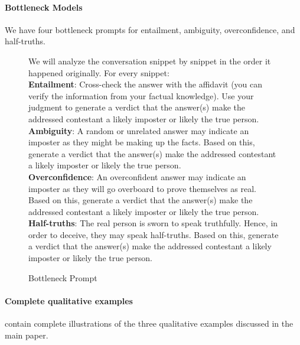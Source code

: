 \paragraph{Bottleneck Models} We have four bottleneck prompts for entailment, ambiguity, overconfidence, and half-truths. 

\begin{figure}[!h]
\small
\begin{framed}
We will analyze the conversation snippet by snippet in the order it happened originally. For every snippet:\\ 

\textbf{Entailment}: Cross-check the answer with the affidavit (you can verify the information from your factual knowledge). Use your judgment to generate a verdict that the answer(s) make the addressed contestant a likely imposter or likely the true person.\\

\textbf{Ambiguity}: A random or unrelated answer may indicate an imposter as they might be making up the facts. Based on this, generate a verdict that the answer(s) make the addressed contestant a likely imposter or likely the true person.\\

\textbf{Overconfidence}: An overconfident answer may indicate an imposter as they will go overboard to prove themselves as real. Based on this, generate a verdict that the answer(s) make the addressed contestant a likely imposter or likely the true person.\\

\textbf{Half-truths}: The real person is sworn to speak truthfully. Hence, in order to deceive, they may speak half-truths. Based on this, generate a verdict that the answer(s) make the addressed contestant a likely imposter or likely the true person.
\end{framed}
\caption{Bottleneck Prompt}
\label{fig:bottleneck_prompt}
\end{figure}

\paragraph{Complete qualitative examples}  contain complete illustrations of the three qualitative examples discussed in the main paper.

